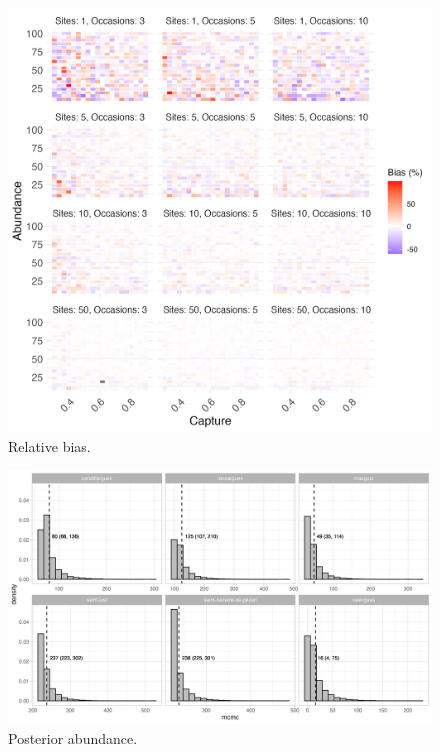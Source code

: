 \documentclass[
  11pt,
  a4paper,
]{article}
\begin{document}
\newpage

\begin{figure}[b]

{\centering \includegraphics[width=0.98\linewidth]{heatmap_bias} 

}

\caption{Relative bias.}\label{fig:bias}
\end{figure}

\clearpage

\newpage

\begin{figure}[b]

{\centering \includegraphics[width=0.98\linewidth]{hist_coypus} 

}

\caption{Posterior abundance.}\label{fig:pdcoypus}
\end{figure}
\end{document}
